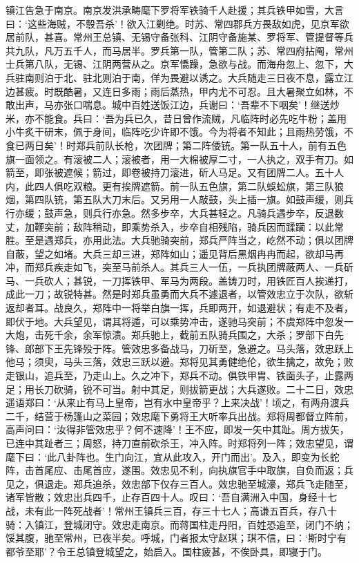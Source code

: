 \documentclass[]{article}
\begin{document}
镇江告急于南京。南京发洪承畴麾下罗将军铁骑千人赴援；其兵铁甲如雪，大言曰：`这些海贼，不彀吾杀'！欲入江剿绝。时苏、常四郡兵方畏敌如虎，见京军欲居前队，甚喜。常州王总镇、无锡守备张科、江阴守备施某、罗将军、管提督等兵共九队，凡万五千人，而马居半。罗兵第一队，管第二队；苏、常四府拈阄，常州士兵第八队，无锡、江阴两营从之。京军憍躁，急欲与战。而海舟忽上、忽下，大兵驻南则泊于北、驻北则泊于南，佯为畏避以诱之。大兵随走三日夜不息，露立江边甚疲。时既酷暑，又连日多雨；雨后蒸热，甲内尤不可忍。且大暑聚立如林，不敢出声，马亦张口喘息。城中百姓送饭江边，兵谢曰：`吾辈不下咽矣'！继送炒米，亦不能食。兵曰：`吾为兵已久，昔日曾作流贼，凡临阵时必先吃牛粉；盖用小牛炙干研末，佩于身间，临阵吃少许即不饿。今为将者不知此；且雨热劳饿，不食已两日矣'！时郑兵前队长枪，次团牌；第二阵倭铳。第一队五十人，前有五色旗一面领之。有滚被二人；滚被者，用一大棉被厚二寸，一人执之，双手有刀。如箭至，即张被遮候；箭过，即卷被持刀滚进，斫人马足。又有团牌二人。五十人内，此四人俱吃双粮。更有挨牌遮箭。前一队五色旗，第二队蜈蚣旗，第三队狼烟，第四队铳，第五队大刀末后。又另用一人敲鼓，头上插一旗。如鼓声缓，则兵行亦缓；鼓声急，则兵行亦急。然多步卒，大兵甚轻之。凡骑兵遇步卒，反退数丈，加鞭突前；敌阵稍动，即乘势杀入，步卒自相残陷，骑兵因而蹂躏：以此常胜。至是遇郑兵，亦用此法。大兵驰骑突前，郑兵严阵当之，屹然不动；俱以团牌自蔽，望之如堵。大兵三却三进，郑阵如山；遥见背后黑烟冉冉而起，欲却马再冲，而郑兵疾走如飞，突至马前杀人。其兵三人一伍，一兵执团牌蔽两人、一兵斫马、一兵砍人；甚锐，一刀挥铁甲、军马为两段。盖铸刀时，用铁匠百人挨递打，成此一刀；故锐特甚。然是时郑兵虽勇而大兵不遽退者，以管效忠立于次队，欲斩返却者耳。战良久，郑阵中一将举白旗一挥，兵即两开，如退避状；有走不及者，即伏于地。大兵望见，谓其将遁，可以乘势冲击，遂驰马突前；不虞郑阵中忽发一大炮，击死千余，余军惊溃。郑兵驰上，截前五队骑兵围之，大杀；罗部下白先锋、郎部下王先锋殁于阵。管效忠多备战马，刀斫至，急避之。马头落，效忠跃上他马；须臾，马头三落，效忠三跃以避。郑将见其勇健绝伦，欲生擒之，故免；败走银山，追兵至，乃走山上。久之冲下，郑兵不动。俱铁甲胄、铁面头子，止露两足；用长刀砍骑，锐不可当。射中其足，则拔箭更战；大兵遂败。二十二日，效忠遥语郑曰：`从来止有马上皇帝，岂有水中皇帝乎？上来决战'！顷之，有两舟渡兵二千，结营于杨篷山之菜园；效忠麾下勇将王大听率兵出战。郑将周都督立阵前，高声问曰：`汝得非管效忠乎？何不速降'！王不应，即发一矢中其趾。周方拔矢，已连中其趾者三；周怒，持刀直前砍杀王，冲入阵。时郑将列一阵；效忠望见，谓麾下曰：`此八卦阵也。生门向江，宜从此攻入，开门而出'。及入，即变为长蛇阵，击首尾应、击尾首应，遂围。效忠见不利，向执旗官手中取旗，自负而返；兵见之，俱退走。郑兵追杀，效忠部下仅存三百人。效忠驰至城濠，郑兵飞走随至，诸军皆散；效忠出兵四千，止存百四十人。叹曰：`吾自满洲入中国，身经十七战，未有此一阵死战者'！常州王镇兵三百，存三十七人；高谦五百兵，存八十骑：入镇江，登城闭守。效忠走南京。而蒋国柱走丹阳，百姓恐追至，闭门不纳；馁其腹，驰至常州，已夜半矣。呼城，门者报太守赵琪；琪不信，曰：`斯时宁有都爷至耶'？令王总镇登城望之，始启入。国柱疲甚，不俟卧具，即寝于门。
\end{document}
